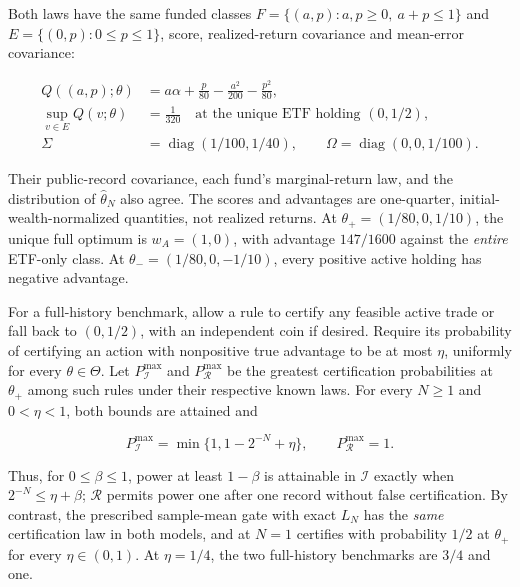 \documentclass[11pt]{article}
\begin{document}
Both laws have the same funded classes
\(F=\{(a,p):a,p\geq0,\ a+p\leq1\}\) and
\(E=\{(0,p):0\leq p\leq1\}\), score, realized-return
covariance and mean-error covariance:

\begin{equation*}
\begin{aligned}
Q((a,p);\theta)&=a\alpha+\frac{p}{80}
                 -\frac{a^2}{200}-\frac{p^2}{80},\\
\sup_{v\in E}Q(v;\theta)&=\frac1{320}
                 \quad\text{at the unique ETF holding }(0,1/2),\\
\Sigma&=\operatorname{diag}(1/100,1/40),\qquad
\Omega=\operatorname{diag}(0,0,1/100).
\end{aligned}\tag{33}\label{eq:33}
\end{equation*}

Their public-record covariance, each fund's marginal-return
law, and the distribution of \(\widehat\theta_N\) also agree.
The scores and advantages are one-quarter, initial-wealth-normalized
quantities, not realized returns.
At \(\theta_+=(1/80,0,1/10)\), the unique full optimum is
\(w_A=(1,0)\), with advantage \(147/1600\) against the
\emph{entire} ETF-only class. At
\(\theta_-=(1/80,0,-1/10)\), every positive active holding
has negative advantage.

For a full-history benchmark, allow a rule to certify any
feasible active trade or fall back to \((0,1/2)\), with an
independent coin if desired. Require its probability of
certifying an action with nonpositive true advantage to be
at most \(\eta\), uniformly for every \(\theta\in\Theta\).
Let \(P^{\max}_{\mathcal I}\) and \(P^{\max}_{\mathcal R}\)
be the greatest certification probabilities at \(\theta_+\)
among such rules under their respective known laws. For every
\(N\geq1\) and \(0<\eta<1\), both bounds are attained and

\begin{equation*}
P^{\max}_{\mathcal I}
 =\min\{1,1-2^{-N}+\eta\},\qquad
P^{\max}_{\mathcal R}=1.
\tag{34}\label{eq:34}
\end{equation*}

Thus, for \(0\leq\beta\leq1\), power at least \(1-\beta\) is attainable in
\(\mathcal I\) exactly when \(2^{-N}\leq\eta+\beta\);
\(\mathcal R\) permits power one after one record without
false certification. By contrast, the prescribed sample-mean
gate with exact \(L_N\) has the \emph{same} certification law in
both models, and at \(N=1\) certifies with probability
\(1/2\) at \(\theta_+\) for every \(\eta\in(0,1)\).
At \(\eta=1/4\), the two full-history benchmarks are
\(3/4\) and one.
\end{document}
